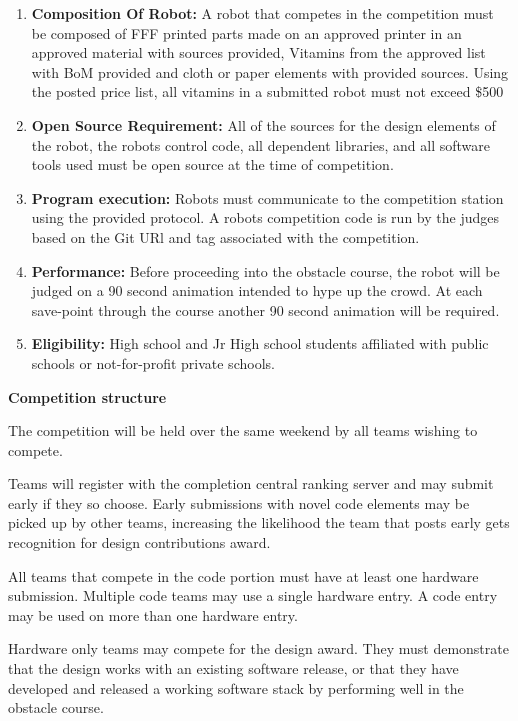 \documentclass{article}
\begin{document}
\begin{enumerate}
	
\item \textbf{Composition Of Robot:} A robot that competes in the competition must be composed of FFF printed parts made on an approved printer in an approved material with sources provided, Vitamins from the approved list with BoM provided and cloth or paper elements with provided sources. Using the posted price list, all vitamins in a submitted robot must not exceed \$500

\item \textbf{Open Source Requirement:} All of the sources for the design elements of the robot, the robots control code, all dependent libraries, and all software tools used must be open source at the time of competition. 

\item \textbf{Program execution:} Robots must communicate to the competition station using the provided protocol. A robots competition code is run by the judges based on the Git URl and tag associated with the competition. 


\item \textbf{Performance:} Before proceeding into the obstacle course, the robot will be judged on a 90 second animation intended to hype up the crowd. At each save-point through the course another 90 second animation will be required. 

\item \textbf{Eligibility:} High school and Jr High school students affiliated with public schools or not-for-profit private schools. 
\end{enumerate}

 \pagebreak

{\huge \textbf{Competition structure}}

The competition will be held over the same weekend by all teams wishing to compete. 

Teams will register with the completion central ranking server and may submit early if they so choose. Early submissions with novel code elements may be picked up by other teams, increasing the likelihood the team that posts early gets recognition for design contributions award.

All teams that compete in the code portion must have at least one hardware submission. Multiple code teams may use a single hardware entry. A code entry may be used on more than one hardware entry. 

Hardware only teams may compete for the design award. They must demonstrate that the design works with an existing software release, or that they have developed and released a working software stack by performing well in the obstacle course. 
\end{document}
